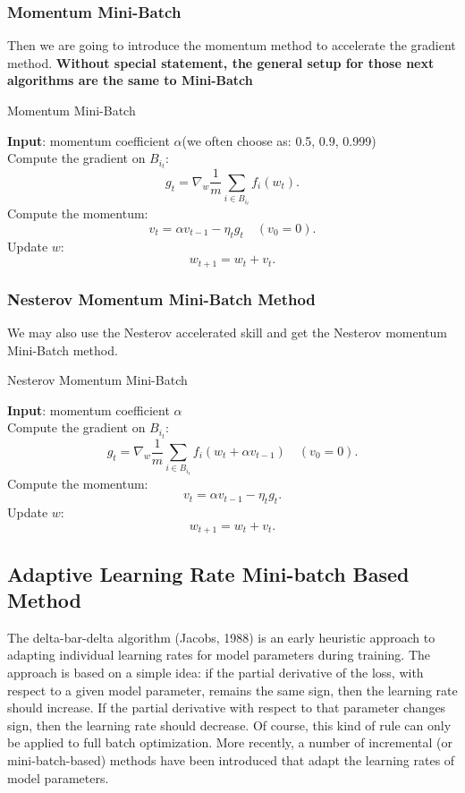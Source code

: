 \subsubsection{Momentum Mini-Batch}
Then we are going to introduce the momentum method to accelerate the gradient method.  
{\bf Without special statement, the general setup for those next algorithms are the same to Mini-Batch}

\begin{algorithm}[H]
\caption{Momentum Mini-Batch}
\label{alg:mom}
{\bf Input}: momentum coefficient $\alpha$(we often choose as: 0.5, 0.9, 0.999) \\
Compute the gradient on $B_{i_t}$:
$$
g_t = \nabla_{w} \frac{1}{m} \sum_{i \in B_{i_t}} f_i(w_{t}).
$$
Compute the momentum:
\begin{equation}
v_t = \alpha v_{t-1} - \eta_t g_t \quad (v_0 = 0).
\end{equation}
Update $w$:
\begin{equation}
w_{t+1} = w_t + v_t.
\end{equation}
\end{algorithm}

\subsubsection{Nesterov Momentum Mini-Batch Method}
We may also use the Nesterov accelerated skill and get the Nesterov momentum Mini-Batch method.
\begin{algorithm}[H]
\caption{Nesterov Momentum Mini-Batch}
\label{alg:Nesterov}
{\bf Input}: momentum coefficient $\alpha$\\
Compute the gradient on $B_{i_t}$:
$$
g_t = \nabla_{w} \frac{1}{m} \sum_{i \in B_{i_t}} f_i(w_{t} + \alpha v_{t-1}) \quad (v_0 = 0).
$$
Compute the momentum:
\begin{equation}
v_t = \alpha v_{t-1} - \eta_t g_t.
\end{equation}
Update $w$:
\begin{equation}
w_{t+1} = w_t + v_t.
\end{equation}
\end{algorithm}


\subsection{Adaptive Learning Rate Mini-batch Based Method}
The delta-bar-delta algorithm (Jacobs, 1988) is an early heuristic approach to adapting individual learning rates for model parameters during training. The approach is based on a simple idea: if the partial derivative of the loss, with respect to a given model parameter, remains the same sign, then the learning rate should increase. If the partial derivative with respect to that parameter changes sign, then the learning rate should decrease. Of course, this kind of rule can only be applied to full batch optimization. More recently, a number of incremental (or mini-batch-based) methods have been introduced that adapt the learning rates of model parameters.


